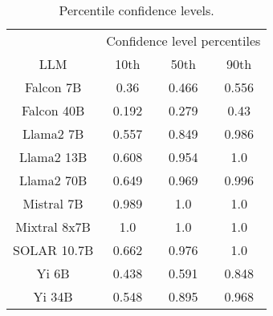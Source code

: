 \begin{table*}
\centering
\begin{tabular}{c|c|c|c}
& \multicolumn{3}{c}{Confidence level percentiles} \\ 
LLM & 10th & 50th & 90th\\ \hline
Falcon 7B & 0.36 & 0.466 & 0.556\\
Falcon 40B & 0.192 & 0.279 & 0.43\\
Llama2 7B & 0.557 & 0.849 & 0.986\\
Llama2 13B & 0.608 & 0.954 & 1.0\\
Llama2 70B & 0.649 & 0.969 & 0.996\\
Mistral 7B & 0.989 & 1.0 & 1.0\\
Mixtral 8x7B & 1.0 & 1.0 & 1.0\\
SOLAR 10.7B & 0.662 & 0.976 & 1.0\\
Yi 6B & 0.438 & 0.591 & 0.848\\
Yi 34B & 0.548 & 0.895 & 0.968\\
\hline
\end{tabular}
\caption{Percentile confidence levels.}
\label{tab:percentile_conf}
\end{table*}
